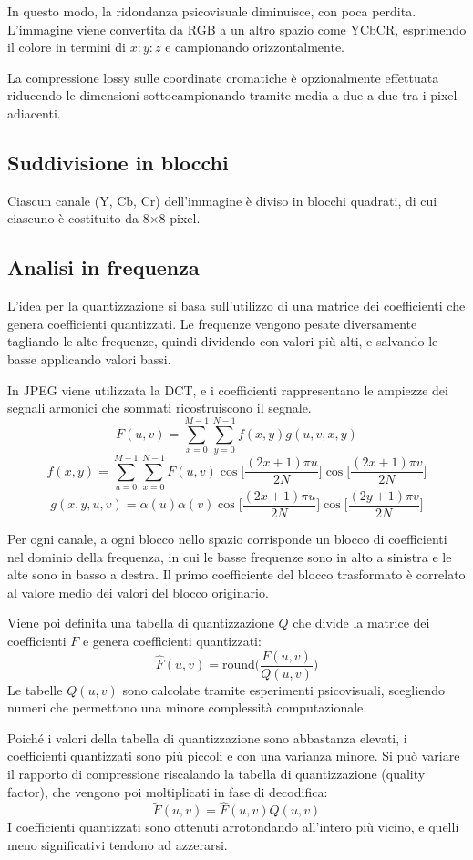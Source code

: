 In questo modo, la ridondanza psicovisuale diminuisce, con poca perdita. L'immagine viene convertita da RGB a un altro spazio come YCbCR, esprimendo il colore in termini di $x : y : z$ e campionando orizzontalmente.

La compressione lossy sulle coordinate cromatiche è opzionalmente effettuata riducendo le dimensioni sottocampionando tramite media a due a due tra i pixel adiacenti. 

\subsection{Suddivisione in blocchi}
Ciascun canale (Y, Cb, Cr) dell'immagine è diviso in blocchi quadrati, di cui ciascuno è costituito da 8$\times$8 pixel. 

\subsection{Analisi in frequenza}
L'idea per la quantizzazione si basa sull'utilizzo di una matrice dei coefficienti che genera coefficienti quantizzati. Le frequenze vengono pesate diversamente tagliando le alte frequenze, quindi dividendo con valori più alti, e salvando le basse applicando valori bassi.

In JPEG viene utilizzata la DCT, e i coefficienti rappresentano le ampiezze dei segnali armonici che sommati ricostruiscono il segnale.
$$F(u, v) = \sum_{x=0}^{M-1}\sum_{y=0}^{N-1} f(x, y) g(u, v, x, y)$$
$$f(x, y) = \sum_{u=0}^{M-1}\sum_{x=0}^{N-1} F(u, v) \cos\bigg[\frac{(2x + 1)\pi u}{2N}\bigg] \cos\bigg[\frac{(2x + 1)\pi v}{2N}\bigg]$$
$$g(x, y, u, v) = \alpha(u) \alpha(v) \cos\bigg[\frac{(2x + 1)\pi u}{2N}\bigg] \cos\bigg[\frac{(2y + 1)\pi v}{2N}\bigg]$$

Per ogni canale, a ogni blocco nello spazio corrisponde un blocco di coefficienti nel dominio della frequenza, in cui le basse frequenze sono in alto a sinistra e le alte sono in basso a destra. Il primo coefficiente del blocco trasformato è correlato al valore medio dei valori del blocco originario.

Viene poi definita una tabella di quantizzazione $Q$ che divide la matrice dei coefficienti $F$ e genera coefficienti quantizzati:
$$\hat{F}(u, v) = \text{round} \bigg(\frac{F(u, v)}{Q(u, v)}\bigg)$$
Le tabelle $Q(u, v)$ sono calcolate tramite esperimenti psicovisuali, scegliendo numeri che permettono una minore complessità computazionale. 

Poiché i valori della tabella di quantizzazione sono abbastanza elevati, i coefficienti quantizzati sono più piccoli e con una varianza minore. Si può variare il rapporto di compressione riscalando la tabella di quantizzazione (quality factor), che vengono poi moltiplicati in fase di decodifica:
$$ \tilde{F}(u, v) = \hat{F}(u, v) Q(u, v)$$
I coefficienti quantizzati sono ottenuti arrotondando all'intero più vicino, e quelli meno significativi tendono ad azzerarsi. 

